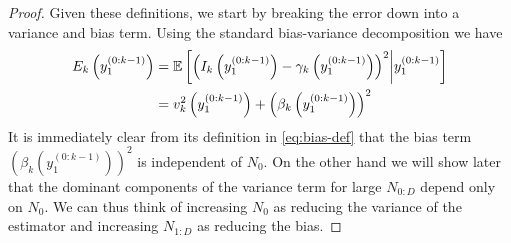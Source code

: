 \begin{proof}
Given these definitions, we start by breaking the error down into a variance and bias term.  Using the standard bias-variance decomposition we have
\begin{align}
\label{eq:bias-var-decomp}
E_k \left(y_1^{(0:k-1)}\right) &= \mathbb{E} \left[\left(I_{k}\left(y^{(0:k-1)}_1\right)-
\gamma_{k}\left(y^{(0:k-1)}_1\right)\right)^2 \middle| y^{(0:k-1)}_1\right]
\nonumber \\
&=v_k^2 \left(y_1^{(0:k-1)} \right)
+\left(\beta_k \left(y_1^{(0:k-1)} \right)\right)^2 
\end{align}
It is immediately clear from its definition in \eqref{eq:bias-def} that the bias term
$\left(\beta_k \left(y_1^{(0:k-1)} \right)\right)^2$ is independent of 
$N_0$.  On the other hand we will show later that the
dominant components of the variance term for large $N_{0:D}$ depend only
on $N_0$.  We can thus think of increasing $N_0$ as reducing the variance of
the estimator and increasing $N_{1:D}$ as reducing the bias.


\end{proof}
